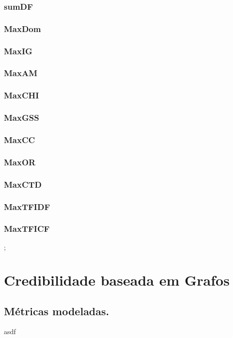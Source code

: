 \subsubsection{sumDF}
\label{subsubsection::sumdf}

\subsubsection{MaxDom}
\label{subsubsection::maxdom}

\subsubsection{MaxIG}
\label{subsubsection::maxig}

\subsubsection{MaxAM}
\label{subsubsection::maxam}

\subsubsection{MaxCHI}
\label{subsubsection::maxchi}

\subsubsection{MaxGSS}
\label{subsubsection::maxgss}

\subsubsection{MaxCC}
\label{subsubsection::maxcc}

\subsubsection{MaxOR}
\label{subsubsection::maxor}

\subsubsection{MaxCTD}
\label{subsubsection::maxctd}

\subsubsection{MaxTFIDF}
\label{subsubsection::maxtfidf}

\subsubsection{MaxTFICF}; 
\label{subsubsection::maxtficf}



\section{Credibilidade baseada em Grafos}
\label{sec::04_cred_baseada_grafos}

\subsection{Métricas modeladas.}
\label{subsec::04_metricas_grafos}

asdf

